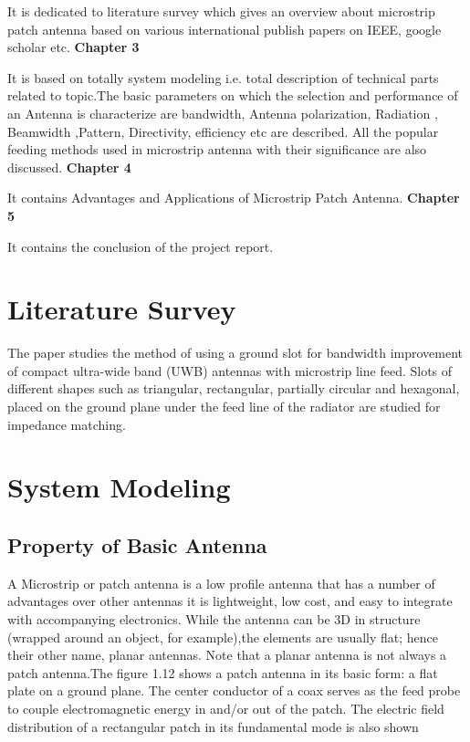\documentclass[12pt]{article}
\begin{document}
      It is dedicated to literature survey which gives an overview about microstrip patch antenna based on various international publish papers on IEEE, google scholar etc.
 \justify
  \textbf{Chapter 3}

      It is based on totally system modeling i.e. total description of technical parts related to topic.The basic parameters on which the selection and performance of an Antenna is characterize are bandwidth, Antenna polarization, Radiation , Beamwidth ,Pattern, Directivity, efficiency etc are described. All the popular feeding methods used in microstrip antenna with their significance are also discussed.
 \justify
  \textbf{Chapter 4}

      It contains Advantages and Applications of Microstrip Patch Antenna.
 \justify
  \textbf{Chapter 5}

      It contains the conclusion of the project report.

\section{Literature Survey}\label{sec:Literature Survey}
\justify
The paper studies the method of using a ground slot for bandwidth improvement of compact ultra-wide band (UWB) antennas with microstrip line feed. Slots of different shapes such as triangular, rectangular, partially circular and hexagonal, placed on the ground plane under the feed line of the radiator are studied for impedance matching. 

%
\cleardoublepage
 
\section{System Modeling}\label{sec:System Modeling}
 \subsection{Property of Basic Antenna}\label{sub:Property of Basic Antenna}
	  \justify
	   A Microstrip or patch antenna is a low profile antenna that has a number of advantages  over other antennas it is lightweight, low cost, and easy to integrate with accompanying  electronics. While the antenna can be 3D in structure (wrapped around an object, for example),the elements are usually flat; hence their other name, planar antennas. Note that a planar antenna is not always a patch antenna.The figure 1.12 shows a patch antenna in its basic form: a flat plate on a ground plane. The center conductor of a coax serves as the feed probe to couple electromagnetic energy in and/or out of the patch. The electric field distribution of a rectangular patch in its fundamental mode is also shown
	
\end{document}
